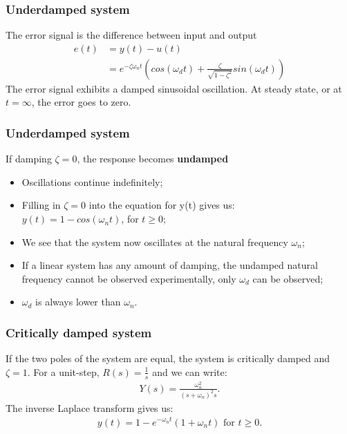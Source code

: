 \begin{frame}
\frametitle{Underdamped system}
The error signal is the difference between input and output
\begin{align*}
e(t)&= y(t) -u(t)\\
&= e^{-\zeta\omega_n t}(cos(\omega_d t)+\frac{\zeta}{\sqrt{1 - \zeta^2}}sin(\omega_d t))
\end{align*}
The error signal exhibits a damped sinusoidal oscillation.
At steady state, or at $t=\infty$, the error goes to zero.
\end{frame}

\begin{frame}
\frametitle{Underdamped system}
If damping $\zeta=0$, the response becomes \textbf{undamped}
\begin{itemize}
\item Oscillations continue indefinitely;
\item Filling in $\zeta=0$ into the equation for y(t) gives us:\\
$y(t) = 1 -cos(\omega_n t)$, for $t\ge 0$;
\item We see that the system now oscillates at the natural frequency $\omega_n$;
\item If a linear system has any amount of damping, the undamped natural frequency cannot be observed experimentally, only $\omega_d$ can be observed;
\item $\omega_d$ is always lower than $\omega_n$.
\end{itemize} 
\end{frame}

\begin{frame}
\frametitle{Critically damped system}
If the two poles of the system are equal, the system is critically damped and $\zeta=1$. For a unit-step, $R(s)=\frac{1}{s}$ and we can write:
\begin{align*}
Y(s) =\frac{\omega_n ^2}{(s+\omega_n)^2 s}.
\end{align*}
The inverse Laplace transform gives us:
\begin{align*}
y(t) = 1 - e^{-\omega_n t}(1+\omega_n t) \text{ for } t\ge 0.
\end{align*}         
\end{frame}

